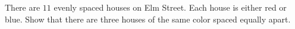 There are $11$ evenly spaced houses on Elm Street. Each house is either red or blue. Show that there are three houses of the same color spaced equally apart.
